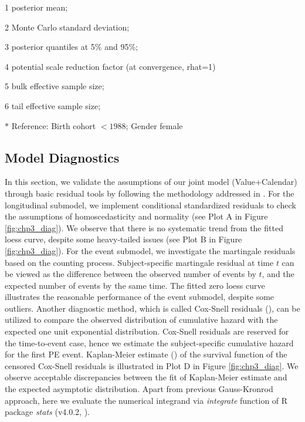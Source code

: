 \begin{table}[H]
\begin{threeparttable}
\begin{tablenotes}[para]
    \footnotesize
    \item[1] posterior mean; \item[2] Monte Carlo standard deviation; \item[3] posterior quantiles at 5\% and 95\%; \item[4] potential scale reduction factor (at convergence, rhat=1) \item[5] bulk effective sample size; \item[6] tail effective sample size; \item[$\ast$] Reference: Birth cohort $<1988$; Gender female
    \end{tablenotes}
    \end{threeparttable}
\end {table}

\subsection{Model Diagnostics}

In this section, we validate the assumptions of our joint model (Value+Calendar) through basic residual tools by following the methodology addressed in \cite{Rizopoulos2012d}. For the longitudinal submodel, we implement conditional standardized residuals to check the assumptions of homoscedasticity and normality (see Plot A in Figure \ref{fig:chp3_diag}). We observe that there is no systematic trend from the fitted loess curve, despite some heavy-tailed issues (see Plot B in Figure \ref{fig:chp3_diag}). For the event submodel, we investigate the martingale residuals based on the counting process. Subject-specific martingale residual at time $t$ can be viewed as the difference between the observed number of events by $t$, and the expected number of events by the same time. The fitted zero loess curve illustrates the reasonable performance of the event submodel, despite some outliers. Another diagnostic method, which is called Cox-Snell residuals (\cite{Cox1968}), can be utilized to compare the observed distribution of cumulative hazard with the expected one unit exponential distribution. Cox-Snell residuals are reserved for the time-to-event case, hence we estimate the subject-specific cumulative hazard for the first PE event. Kaplan-Meier estimate (\cite{Kaplan1958}) of the survival function of the censored Cox-Snell residuals is illustrated in Plot D in Figure \ref{fig:chp3_diag}. We observe acceptable discrepancies between the fit of Kaplan-Meier estimate and the expected asymptotic distribution. Apart from previous Gauss-Kronrod approach, here we evaluate the numerical integrand via \emph{integrate} function of R package \emph{stats} (v4.0.2, \cite{R2020}).     

